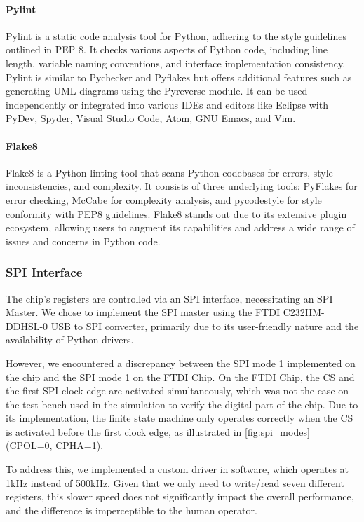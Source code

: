 \paragraph{Pylint}
\label{par:Pylint}
Pylint is a static code analysis tool for Python, adhering to the style guidelines outlined in PEP 8. It checks various aspects of Python code, including line length, variable naming conventions, and interface implementation consistency. Pylint is similar to Pychecker and Pyflakes but offers additional features such as generating UML diagrams using the Pyreverse module. It can be used independently or integrated into various IDEs and editors like Eclipse with PyDev, Spyder, Visual Studio Code, Atom, GNU Emacs, and Vim\cite{Wikipedia:Pylint}.

\paragraph{Flake8}
\label{Par:Flake8}
Flake8 is a Python linting tool that scans Python codebases for errors, style inconsistencies, and complexity. It consists of three underlying tools: PyFlakes for error checking, McCabe for complexity analysis, and pycodestyle for style conformity with PEP8 guidelines. Flake8 stands out due to its extensive plugin ecosystem, allowing users to augment its capabilities and address a wide range of issues and concerns in Python code\cite{flake8}.


\subsubsection{SPI Interface}
\label{subsubsec:SPI}
The chip's registers are controlled via an SPI interface, necessitating an SPI Master. We chose to implement the SPI master using the FTDI C232HM-DDHSL-0 USB to SPI converter, primarily due to its user-friendly nature and the availability of Python drivers. 

However, we encountered a discrepancy between the SPI mode 1 implemented on the chip and the SPI mode 1 on the FTDI Chip. On the FTDI Chip, the CS and the first SPI clock edge are activated simultaneously, which was not the case on the test bench used in the simulation to verify the digital part of the chip. Due to its implementation, the finite state machine only operates correctly when the CS is activated before the first clock edge, as illustrated in \autoref{fig:spi_modes} (CPOL=0, CPHA=1). 

To address this, we implemented a custom driver in software, which operates at 1kHz instead of 500kHz. Given that we only need to write/read seven different registers, this slower speed does not significantly impact the overall performance, and the difference is imperceptible to the human operator. 

